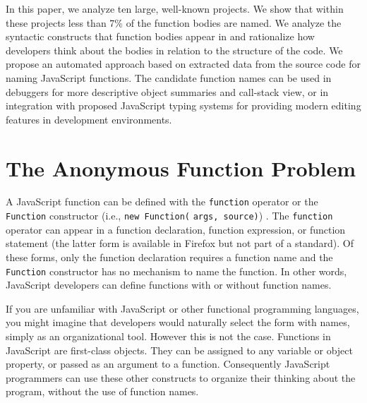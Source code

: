 \documentclass[10pt, preprint]{sigplanconf}
\begin{document}
In this paper, we analyze ten large, well-known projects. We show that within these projects less than 7\% of the function bodies are named. 
We analyze the syntactic constructs that function bodies appear in and rationalize how developers think about the bodies in relation to the structure of the code.
We propose an automated approach based on extracted data from the source code for naming JavaScript functions. The candidate function names can be used in debuggers for more descriptive object summaries and call-stack view, or in integration with proposed JavaScript typing systems for providing modern editing features in development environments. 




\section{The Anonymous Function Problem}

A JavaScript function can be defined with the \verb|function| operator or the \verb|Function| constructor (i.e., \verb|new Function(| \verb|args, source)|) \cite{ECMA}. The \verb|function| operator can appear in a function declaration, function expression, or function statement (the latter form is available in Firefox but not part of a standard).  Of these forms, only the function declaration requires a function name and the \verb|Function| constructor has no mechanism to name the function.  In other words, JavaScript developers can define functions with or without function names.

If you are unfamiliar with JavaScript or other functional programming languages, you might imagine that developers would naturally select the form with names, simply as an organizational tool. However this is not the case. Functions in JavaScript are first-class objects. They can be assigned to any variable or object property, or passed as an argument to a function. Consequently JavaScript programmers can use these other constructs to organize their thinking about the program, without the use of function names.
\end{document}
